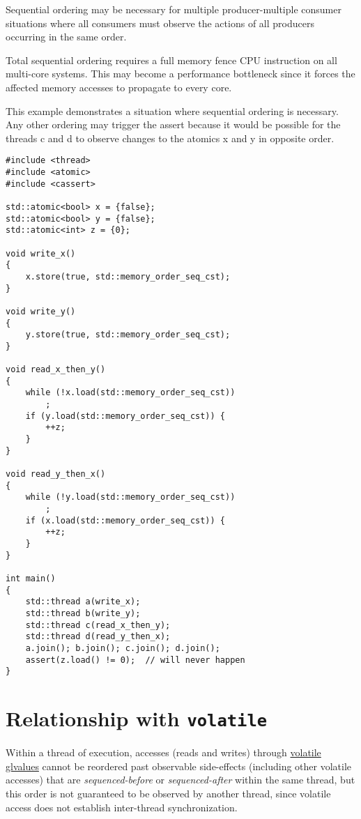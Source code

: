 \documentclass[a4paper,12pt,notitlepage,twoside,openright]{article}
\begin{document}
Sequential ordering may be necessary for multiple producer-multiple
consumer situations where all consumers must observe the actions of all
producers occurring in the same order.

Total sequential ordering requires a full memory fence CPU instruction
on all multi-core systems. This may become a performance bottleneck
since it forces the affected memory accesses to propagate to every core.

This example demonstrates a situation where sequential ordering is
necessary. Any other ordering may trigger the assert because it would be
possible for the threads c and d to observe changes to the atomics x and
y in opposite order.

\begin{verbatim}
#include <thread>
#include <atomic>
#include <cassert>

std::atomic<bool> x = {false};
std::atomic<bool> y = {false};
std::atomic<int> z = {0};

void write_x()
{
    x.store(true, std::memory_order_seq_cst);
}

void write_y()
{
    y.store(true, std::memory_order_seq_cst);
}

void read_x_then_y()
{
    while (!x.load(std::memory_order_seq_cst))
        ;
    if (y.load(std::memory_order_seq_cst)) {
        ++z;
    }
}

void read_y_then_x()
{
    while (!y.load(std::memory_order_seq_cst))
        ;
    if (x.load(std::memory_order_seq_cst)) {
        ++z;
    }
}

int main()
{
    std::thread a(write_x);
    std::thread b(write_y);
    std::thread c(read_x_then_y);
    std::thread d(read_y_then_x);
    a.join(); b.join(); c.join(); d.join();
    assert(z.load() != 0);  // will never happen
}
\end{verbatim}

\hypertarget{relationship-with-volatile}{%
\section{Relationship with \texttt{volatile}}\label{relationship-with-volatile}}

Within a thread of execution, accesses (reads and writes) through
\href{https://en.cppreference.com/w/cpp/language/cv}{volatile glvalues}
cannot be reordered past observable side-effects (including other
volatile accesses) that are \emph{sequenced-before} or
\emph{sequenced-after} within the same thread, but this order is not
guaranteed to be observed by another thread, since volatile access does
not establish inter-thread synchronization.
\end{document}
